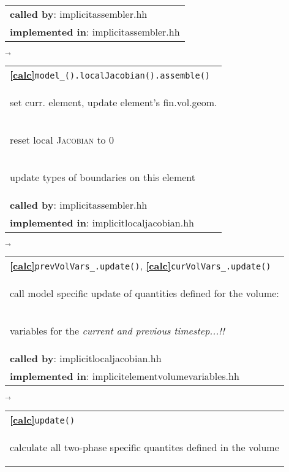 \begin{landscape}
{\begin{tabular}{|l|}
      \textbf{called by}: implicitassembler.hh\\
      \textbf{implemented in}: implicitassembler.hh\\  
      \hline
     \end{tabular}
\nextline
    {\scriptsize$\overrightarrow{
        }$}
     \begin{tabular}{|l|}
      \hline
     \textbf{\textcircled{\ref{calc}}}\verb+model_().localJacobian().assemble()+ \\
     \begin{scriptsize}set curr. element, update element's fin.vol.geom.\end{scriptsize}\\
     \begin{scriptsize}reset local \textsc{Jacobian} to 0\end{scriptsize}\\
     \begin{scriptsize}update types of boundaries on this element\end{scriptsize}\\
      \textbf{called by}: implicitassembler.hh\\
      \textbf{implemented in}:  implicitlocaljacobian.hh\\  
	\hline
  \end{tabular}
    $\overrightarrow{
    }$
    \begin{tabular}{|l|}
      \hline
      \textbf{\textcircled{\ref{calc}}}\verb+prevVolVars_.update()+, \textbf{\textcircled{\ref{calc}}}\verb+curVolVars_.update()+ \\
    \begin{scriptsize}call model specific update of quantities defined for the volume:\end{scriptsize}\\
    \begin{scriptsize}variables for the \emph{current and previous timestep...!!}\end{scriptsize}\\
      \textbf{called by}: implicitlocaljacobian.hh\\
      \textbf{implemented in}: implicitelementvolumevariables.hh\\  
	\hline
  \end{tabular}
\nextline
    $\overrightarrow{
    }$
    \begin{tabular}{||l||}
      \hline\hline
      \textbf{\textcircled{\ref{calc}}}\verb+update()+ \\
    \begin{scriptsize}calculate all two-phase specific quantites defined in the volume\end{scriptsize}\\

\end{tabular}}
\end{landscape}
